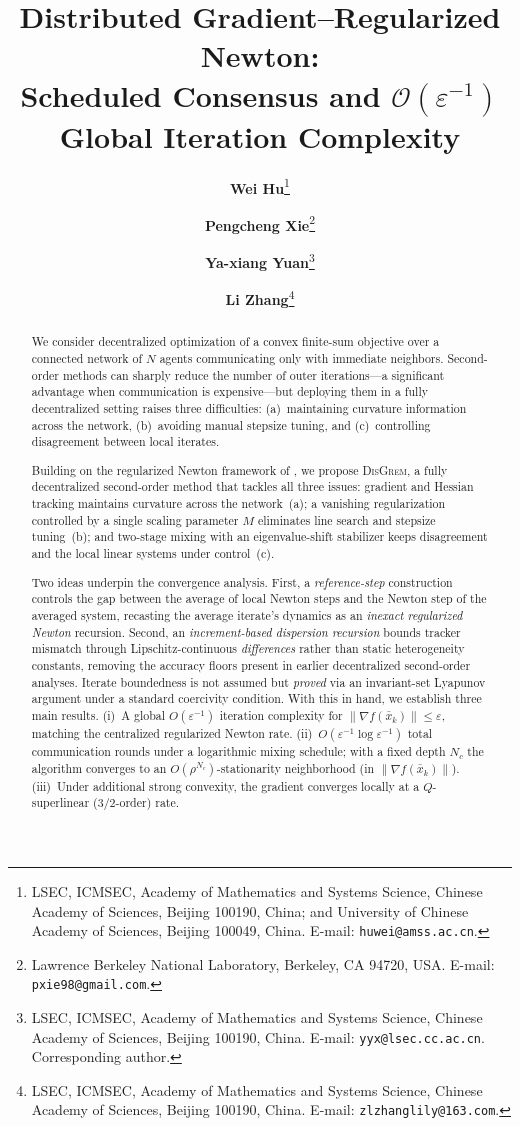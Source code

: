 \documentclass[11pt,a4paper]{article}
\title{\textbf{Distributed Gradient--Regularized Newton:\\
		Scheduled Consensus and \texorpdfstring{$\mathcal{O}(\varepsilon^{-1})$}{O(eps\^{}-1)} Global Iteration Complexity}}
\author{
	\textbf{Wei Hu}\thanks{
		LSEC, ICMSEC, Academy of Mathematics and Systems Science,
		Chinese Academy of Sciences, Beijing 100190, China;
		and University of Chinese Academy of Sciences, Beijing 100049, China.
		E-mail: \texttt{huwei@amss.ac.cn}.
	}
	\and
	\textbf{Pengcheng Xie}\thanks{
		Lawrence Berkeley National Laboratory,
		Berkeley, CA 94720, USA.
		E-mail: \texttt{pxie98@gmail.com}.
	}
	\and
	\textbf{Ya-xiang Yuan}\thanks{
		LSEC, ICMSEC, Academy of Mathematics and Systems Science,
		Chinese Academy of Sciences, Beijing 100190, China.
		E-mail: \texttt{yyx@lsec.cc.ac.cn}.
		Corresponding author.
	}
	\and
	\textbf{Li Zhang}\thanks{
		LSEC, ICMSEC, Academy of Mathematics and Systems Science,
		Chinese Academy of Sciences, Beijing 100190, China.
		E-mail: \texttt{zlzhanglily@163.com}.
	}
}
\date{}
\def\cO{O}%
\newcommand{\cO}{\mathcal{O}}
\begin{document}
	\maketitle
	
\begin{abstract}
	We consider decentralized optimization of a convex finite-sum objective over a connected
	network of $N$ agents communicating only with immediate neighbors.
	Second-order methods can sharply reduce the number of outer iterations---a
	significant advantage when communication is expensive---but deploying them in a
	fully decentralized setting raises three difficulties:
	(a)~maintaining curvature information across the network,
	(b)~avoiding manual stepsize tuning,
	and (c)~controlling disagreement between local iterates.
	
	Building on the regularized Newton framework of
	\citet{mishchenko2023rn}, we propose \textsc{DisGrem}, a fully
	decentralized second-order method that tackles all three issues:
	gradient and Hessian tracking maintains curvature across the
	network~(a); a vanishing regularization controlled by a single
	scaling parameter $M$ eliminates line search and stepsize
	tuning~(b); and two-stage mixing with an eigenvalue-shift
	stabilizer keeps disagreement and the local linear systems
	under control~(c).
	
	Two ideas underpin the convergence analysis.
	First, a \emph{reference-step} construction controls the gap between
	the average of local Newton steps and the Newton step of the
	averaged system, recasting the average iterate's dynamics as an
	\emph{inexact regularized Newton} recursion.
	Second, an \emph{increment-based dispersion recursion} bounds tracker
	mismatch through Lipschitz-continuous \emph{differences} rather than
	static heterogeneity constants, removing the accuracy floors present
	in earlier decentralized second-order analyses.
	Iterate boundedness is not assumed but \emph{proved} via an
	invariant-set Lyapunov argument under a standard coercivity condition.
	With this in hand, we establish three main results.
	(i)~A global $\cO(\varepsilon^{-1})$ iteration complexity for
	$\|\nabla f(\bar x_k)\|\le\varepsilon$, matching the centralized
	regularized Newton rate.
	(ii)~$\cO(\varepsilon^{-1}\log\varepsilon^{-1})$ total communication
	rounds under a logarithmic mixing schedule; with a fixed depth $N_c$
	the algorithm converges to an
	$\cO(\rho^{N_c})$-stationarity neighborhood
	(in $\|\nabla f(\bar x_k)\|$).
	(iii)~Under additional strong convexity, the gradient converges
	locally at a $Q$-superlinear ($3/2$-order) rate.
	

\end{abstract}
\end{document}
